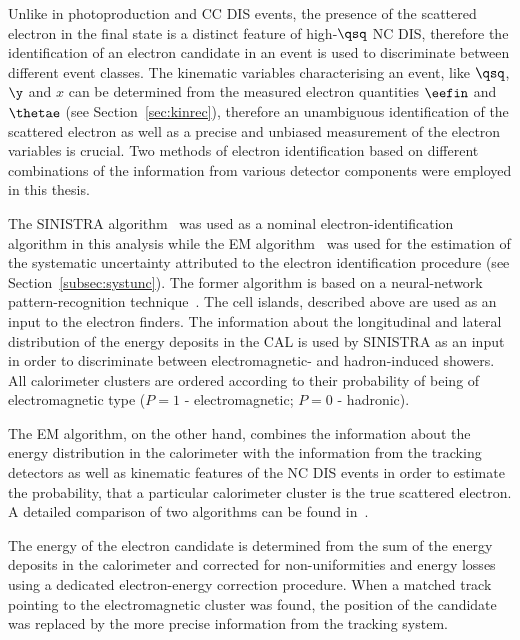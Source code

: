 Unlike in photoproduction and CC DIS events, the presence of the scattered electron in the final state is a distinct feature of high-$\qsq$ NC DIS, therefore the identification of an electron candidate in an event is used to discriminate between different event classes. The kinematic variables characterising an event, like $\qsq$, $\y$ and $x$ can be determined from the measured electron quantities $\eefin$ and $\thetae$ (see Section~\ref{sec:kinrec}), therefore an unambiguous identification of the scattered electron as well as a precise and unbiased measurement of the electron variables is crucial. Two methods of electron identification based on different combinations of the information from various detector components were employed in this thesis. 

The SINISTRA algorithm~\cite{nim:a365:508} was used as a nominal electron-identification algorithm in this analysis while the EM algorithm~\cite{epj:c11:427,upub:Straub:url} was used for the estimation of the systematic uncertainty attributed to the electron identification procedure (see Section~\ref{subsec:systunc}). The former algorithm is based on a neural-network pattern-recognition technique~\cite{desy:95:54}. The cell islands, described above are used as an input to the electron finders. The information about the longitudinal and lateral distribution of the energy deposits in the CAL is used by SINISTRA as an input in order to discriminate between electromagnetic- and hadron-induced showers. All calorimeter clusters are ordered according to their probability of being of electromagnetic type ($P=1$ - electromagnetic; $P=0$ - hadronic). 

The EM algorithm, on the other hand, combines the information about the energy distribution in the calorimeter with the information from the tracking detectors as well as kinematic features of the NC DIS events in order to estimate the probability, that a particular calorimeter cluster is the true scattered electron. A detailed comparison of two algorithms can be found in~\cite{upub:schlenstedt:zn9977}.

The energy of the electron candidate is determined from the sum of the energy deposits in the calorimeter and corrected for non-uniformities and energy losses using a dedicated electron-energy correction procedure. When a matched track pointing to the electromagnetic cluster was found, the position of the candidate was replaced by the more precise information from the tracking system.
